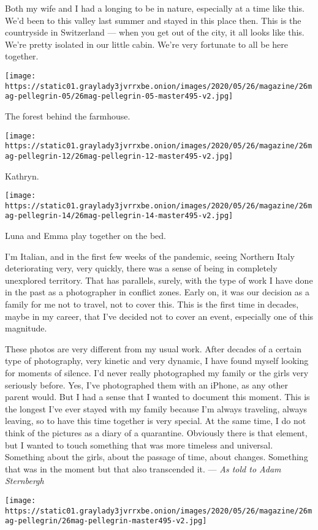 Both my wife and I had a longing to be in nature, especially at a time
like this. We'd been to this valley last summer and stayed in this place
then. This is the countryside in Switzerland --- when you get out of the
city, it all looks like this. We're pretty isolated in our little cabin.
We're very fortunate to all be here together.

\texttt{[image: https://static01.graylady3jvrrxbe.onion/images/2020/05/26/magazine/26mag-pellegrin-05/26mag-pellegrin-05-master495-v2.jpg]}

The forest behind the farmhouse.

\texttt{[image: https://static01.graylady3jvrrxbe.onion/images/2020/05/26/magazine/26mag-pellegrin-12/26mag-pellegrin-12-master495-v2.jpg]}

Kathryn.

\texttt{[image: https://static01.graylady3jvrrxbe.onion/images/2020/05/26/magazine/26mag-pellegrin-14/26mag-pellegrin-14-master495-v2.jpg]}

Luna and Emma play together on the bed.

I'm Italian, and in the first few weeks of the pandemic, seeing Northern
Italy deteriorating very, very quickly, there was a sense of being in
completely unexplored territory. That has parallels, surely, with the
type of work I have done in the past as a photographer in conflict
zones. Early on, it was our decision as a family for me not to travel,
not to cover this. This is the first time in decades, maybe in my
career, that I've decided not to cover an event, especially one of this
magnitude.

These photos are very different from my usual work. After decades of a
certain type of photography, very kinetic and very dynamic, I have found
myself looking for moments of silence. I'd never really photographed my
family or the girls very seriously before. Yes, I've photographed them
with an iPhone, as any other parent would. But I had a sense that I
wanted to document this moment. This is the longest I've ever stayed
with my family because I'm always traveling, always leaving, so to have
this time together is very special. At the same time, I do not think of
the pictures as a diary of a quarantine. Obviously there is that
element, but I wanted to touch something that was more timeless and
universal. Something about the girls, about the passage of time, about
changes. Something that was in the moment but that also transcended it.
--- \emph{As told to Adam Sternbergh}

\texttt{[image: https://static01.graylady3jvrrxbe.onion/images/2020/05/26/magazine/26mag-pellegrin/26mag-pellegrin-master495-v2.jpg]}

